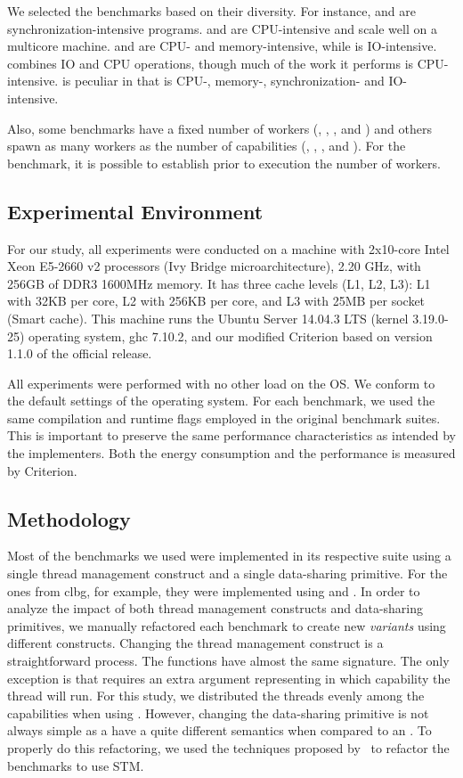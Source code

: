 We selected the benchmarks based on their diversity. For instance, \chameneos and \dining are synchronization-intensive programs. \mandelbrot and \spectral are CPU-intensive and scale well on a multicore machine. \knucleotide and \regex are CPU- and memory-intensive, while \warp is IO-intensive. \tsearch combines IO and CPU operations, though much of the work it performs is CPU-intensive. \fasta is peculiar in that is CPU-, memory-, synchronization- and IO-intensive.

Also, some benchmarks have a fixed number of workers (\chameneos, \knucleotide, \regex, and \dining) and others spawn as many workers as the number of capabilities (\fasta, \mandelbrot, \spectral, \tsearch and \warp). For the \dining benchmark, it is possible to establish prior to execution the number of workers.

\subsection{Experimental Environment}
For our study, all experiments were conducted on a machine with 2x10-core Intel Xeon E5-2660 v2 processors (Ivy Bridge microarchitecture), 2.20 GHz, with 256GB of DDR3 1600MHz memory. It has three cache levels (L1, L2, L3): L1 with 32KB per core, L2 with 256KB per core, and L3 with 25MB per socket (Smart cache). This machine runs the Ubuntu Server 14.04.3 LTS (kernel 3.19.0-25) operating system, \acs{ghc} 7.10.2, and our modified Criterion based on version 1.1.0 of the official release.

All experiments were performed with no other load on the OS. We conform to the default settings of the operating system. For each benchmark, we used the same compilation and runtime flags employed in the original benchmark suites. This is important to preserve the same performance characteristics as intended by the implementers. Both the energy consumption and the performance is measured by Criterion.

\subsection{Methodology}
Most of the benchmarks we used were implemented in its respective suite using a single thread management construct and a single data-sharing primitive. For the ones from \acs{clbg}, for example, they were implemented using \forkIO and \MVar. In order to analyze the impact of both thread management constructs and data-sharing primitives, we manually refactored each benchmark to create new \emph{variants} using different constructs. Changing the thread management construct is a straightforward process. The functions have almost the same signature. The only exception is \forkOn that requires an extra argument representing in which capability the thread will run. For this study, we distributed the threads evenly among the capabilities when using \forkOn. However, changing the data-sharing primitive is not always simple as a \TVar have a quite different semantics when compared to an \MVar. To properly do this refactoring, we used the techniques proposed by~ to refactor the benchmarks to use STM.

